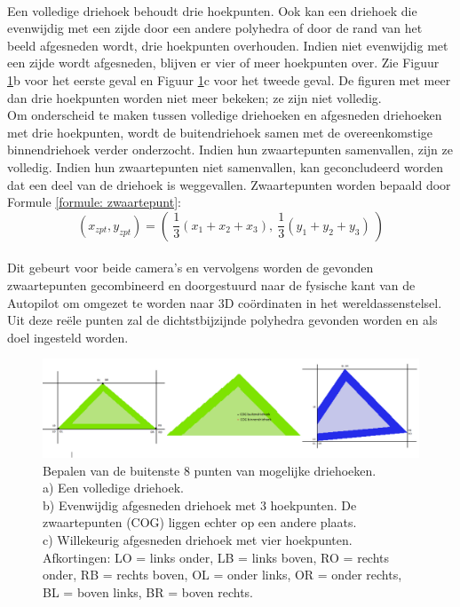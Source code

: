 \\
Een volledige driehoek behoudt drie hoekpunten. Ook kan een driehoek die evenwijdig met een zijde door een andere polyhedra of door de rand van het beeld afgesneden wordt, drie hoekpunten overhouden. Indien niet evenwijdig met een zijde wordt afgesneden, blijven er vier of meer hoekpunten over. Zie Figuur \ref{fig:DrieGevallenDriehoeken}b voor het eerste geval en Figuur \ref{fig:DrieGevallenDriehoeken}c voor het tweede geval. De figuren met meer dan drie hoekpunten worden niet meer bekeken; ze zijn niet volledig.
\\
Om onderscheid te maken tussen volledige driehoeken en afgesneden driehoeken met drie hoekpunten, wordt de buitendriehoek samen met de overeenkomstige binnendriehoek verder onderzocht. Indien hun zwaartepunten samenvallen, zijn ze volledig. Indien hun zwaartepunten niet samenvallen, kan geconcludeerd worden dat een deel van de driehoek is weggevallen. Zwaartepunten worden bepaald door Formule \ref{formule: zwaartepunt}: \begin{equation}
\label{formule: zwaartepunt}
(x_{zpt},y_{zpt}) = ( \ \frac{1}{3}(x_1 + x_2 + x_3) , \ \frac{1}{3}(y_1 + y_2 + y_3) \ )
\end{equation}
\\
Dit gebeurt voor beide camera's en vervolgens worden de gevonden zwaartepunten gecombineerd en doorgestuurd naar de fysische kant van de Autopilot om omgezet te worden naar 3D co\"ordinaten in het wereldassenstelsel. Uit deze re\"ele punten zal de dichtstbijzijnde polyhedra gevonden worden en als doel ingesteld worden.
\\
\begin{figure}[h]
	\centering
	\includegraphics[width=1\textwidth]{BeeldverwerkingDriehoeken.png}
	\caption{Bepalen van de buitenste 8 punten van mogelijke driehoeken. \\ a) Een volledige driehoek. \\ b) Evenwijdig afgesneden driehoek met 3 hoekpunten. De zwaartepunten (COG) liggen echter op een andere plaats. \\ c) Willekeurig afgesneden driehoek met vier hoekpunten. \\ 
	Afkortingen: LO = links onder, LB = links boven, RO = rechts onder, RB = rechts boven, OL = onder links, OR = onder rechts, BL = boven links, BR = boven rechts.}
	\label{fig:DrieGevallenDriehoeken}
\end{figure}

